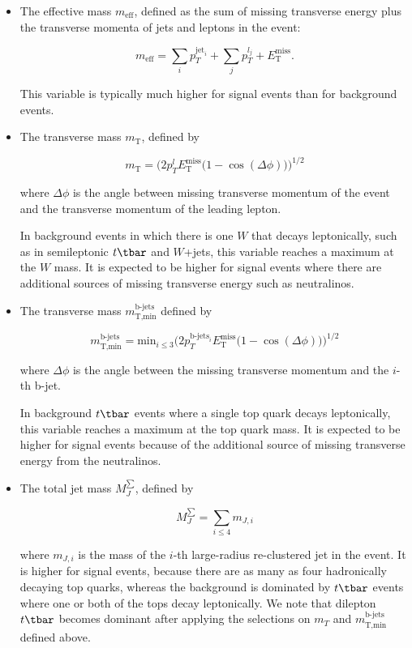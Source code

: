 \begin{itemize}

	\item The effective mass $m_{\text{eff}}$, defined as the sum of missing
	      transverse energy plus the transverse momenta of jets and leptons in the event:

	      $$m_{\text{eff}} = \sum_i p_T^{\text{jet}_i} + \sum_j p_T^{l_j} + E_{\text{T}}^{\text{miss}}.$$

	      This variable is typically much higher for signal events than for background events.


	\item The transverse mass $m_{\text{T}}$, defined by

	      $$m_{\text{T}} = \bigg(2p_T^l E_{\text{T}}^{\text{miss}} \big(1 - \cos(\Delta\phi) \big) \bigg)^{1/2}$$

	      where $\Delta \phi$ is the angle between missing transverse momentum of the
	      event and the transverse momentum of the leading lepton.

	      In background events in which there is one $W$ that decays leptonically,
	      such as in semileptonic $t\tbar$ and $W$+jets, this variable reaches a
	      maximum at the $W$ mass. It is expected to be higher for signal events
	      where there are additional sources of missing transverse energy such as
	      neutralinos.


	\item The transverse mass $m_{\text{T,min}}^{\text{b-jets}}$ defined by

	      $$m_{\text{T,min}}^{\text{b-jets}} = \text{min}_{i\leq 3} \bigg(2
		      p_T^{\text{b-jets}_i} E_{\text{T}}^{\text{miss}} \big( 1 -
		      \cos(\Delta\phi)\big) \bigg)^{1/2}$$

	      where $\Delta \phi$ is the angle between the missing transverse momentum and
	      the $i$-th b-jet.

	      In background $t\tbar$ events where a single top quark decays
	      leptonically, this variable reaches a maximum at the top quark mass. It
	      is expected to be higher for signal events because of the additional
	      source of missing transverse energy from the neutralinos.

	\item The total jet mass $M_J^{\sum}$, defined by

	      $$M_J^{\sum} = \sum_{i\leq 4}m_{J, i} $$

	      where $m_{J, i}$ is the mass of the $i$-th large-radius re-clustered jet in the
	      event. It is higher for signal events, because there are as many as four
	      hadronically decaying top quarks, whereas the background is dominated by
	      $t\tbar$ events where one or both of the tops decay leptonically. We note that
	      dilepton $t\tbar$ becomes dominant after applying the selections on $m_T$ and
	      $m_{\text{T,min}}^{\text{b-jets}}$ defined above.

\end{itemize}



